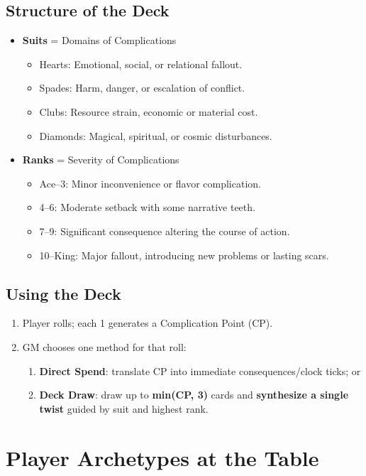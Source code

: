 \documentclass[11pt]{article}
\begin{document}
\subsection{Structure of the Deck}
\begin{itemize}
    \item \textbf{Suits} = Domains of Complications
    \begin{itemize}
        \item Hearts: Emotional, social, or relational fallout.
        \item Spades: Harm, danger, or escalation of conflict.
        \item Clubs: Resource strain, economic or material cost.
        \item Diamonds: Magical, spiritual, or cosmic disturbances.
    \end{itemize}
    \item \textbf{Ranks} = Severity of Complications
    \begin{itemize}
        \item Ace–3: Minor inconvenience or flavor complication.
        \item 4–6: Moderate setback with some narrative teeth.
        \item 7–9: Significant consequence altering the course of action.
        \item 10–King: Major fallout, introducing new problems or lasting scars.
    \end{itemize}
\end{itemize}

\subsection{Using the Deck}
\begin{enumerate}
  \item Player rolls; each 1 generates a Complication Point (CP).
  \item GM chooses one method for that roll:
  \begin{enumerate}
    \item \textbf{Direct Spend}: translate CP into immediate consequences/clock ticks; or
    \item \textbf{Deck Draw}: draw up to \textbf{min(CP, 3)} cards and \textbf{synthesize a single twist}
    guided by suit and highest rank.
  \end{enumerate}
\end{enumerate}

\section{Player Archetypes at the Table}
\end{document}
